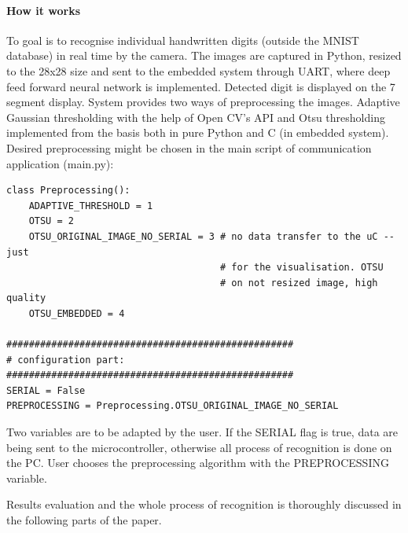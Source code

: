 \paragraph{How it works}
To goal is to recognise individual handwritten digits (outside the MNIST database) in real time by the camera. The images are captured in Python, resized to the 28x28 size and sent to the embedded system through UART, where deep feed forward neural network is implemented. Detected digit is displayed on the 7 segment display. System provides two ways of preprocessing the images. Adaptive Gaussian thresholding with the help of Open CV's API and Otsu thresholding implemented from the basis both in pure Python and C (in embedded system). Desired preprocessing might be chosen in the main script of communication application (main.py):
\begin{verbatim}
class Preprocessing():
    ADAPTIVE_THRESHOLD = 1
    OTSU = 2
    OTSU_ORIGINAL_IMAGE_NO_SERIAL = 3 # no data transfer to the uC -- just 
                                      # for the visualisation. OTSU
                                      # on not resized image, high quality
    OTSU_EMBEDDED = 4
    
###################################################
# configuration part:
###################################################
SERIAL = False
PREPROCESSING = Preprocessing.OTSU_ORIGINAL_IMAGE_NO_SERIAL
\end{verbatim}
Two variables are to be adapted by the user. If the SERIAL flag is true, data are being sent to the microcontroller, otherwise all process of recognition is done on the PC. User chooses the preprocessing algorithm with the PREPROCESSING variable.

Results evaluation and the whole process of recognition is thoroughly discussed in the following parts of the paper. 

